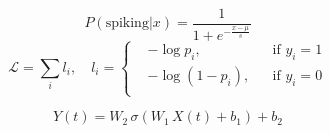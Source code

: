 \documentclass[a4paper, 10pt]{article}
\begin{document}
  \begin{equation}
    P(\text{spiking}|x) = \frac{1}{1 + e^{-\frac{x - \mu}{s}}}
  \end{equation}
  \begin{equation}
    \mathcal{L} = \sum_{i}l_i, \quad l_i = \left\{
    \begin{aligned}
      &-\log p_i, &&\text{if }y_i = 1\\
      &-\log (1 - p_i), &&\text{if }y_i = 0\\
    \end{aligned}\right.
  \end{equation}

  \begin{equation}
    Y(t) = W_2 \, \sigma(W_1 \, X(t) + b_1) + b_2
  \end{equation}
\end{document}
